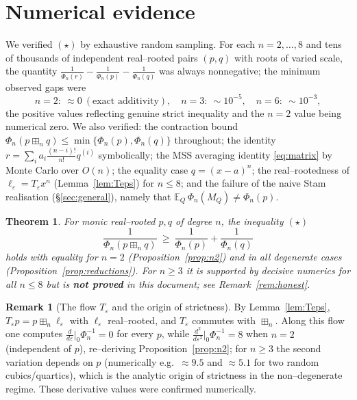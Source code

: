 \documentclass[12pt]{article}
\newtheorem{theorem}{Theorem}
\theoremstyle{definition}
\newtheorem{remark}{Remark}
\newcommand{\bE}{\mathbb{E}}
\newcommand{\boxp}{\boxplus_n}
\begin{document}
\section{Numerical evidence}

We verified $(\star)$ by exhaustive random sampling. For each $n=2,\dots,8$ and tens of
thousands of independent real--rooted pairs $(p,q)$ with roots of varied scale, the
quantity $\frac1{\Phi_n(r)}-\frac1{\Phi_n(p)}-\frac1{\Phi_n(q)}$ was always nonnegative; the
minimum observed gaps were
\[
n{=}2{:}\ \approx0\ (\text{exact additivity}),\quad
n{=}3{:}\ \sim10^{-5},\quad
n{=}6{:}\ \sim10^{-3},
\]
the positive values reflecting genuine strict inequality and the $n=2$ value being numerical
zero. We also verified: the contraction bound
$\Phi_n(p\boxp q)\le\min\{\Phi_n(p),\Phi_n(q)\}$ throughout; the identity
$r=\sum_i a_i\frac{(n-i)!}{n!}q^{(i)}$ symbolically; the MSS averaging identity
\eqref{eq:matrix} by Monte Carlo over $O(n)$; the equality case $q=(x-a)^n$; the
real--rootedness of $\ell_\varepsilon=T_\varepsilon x^n$ (Lemma~\ref{lem:Teps}) for
$n\le8$; and the failure of the naive Stam realisation (\S\ref{sec:general}), namely that
$\bE_Q\,\Phi_n(M_Q)\ne\Phi_n(p)$.

\begin{theorem}\label{thm:main}
For monic real--rooted $p,q$ of degree $n$, the inequality $(\star)$
\[
\frac{1}{\Phi_n(p\boxp q)}\ \ge\ \frac{1}{\Phi_n(p)}+\frac{1}{\Phi_n(q)}
\]
holds with equality for $n=2$ (Proposition~\ref{prop:n2}) and in all degenerate cases
(Proposition~\ref{prop:reductions}). For $n\ge3$ it is supported by decisive numerics for all
$n\le8$ but is \textbf{not proved} in this document; see Remark~\ref{rem:honest}.
\end{theorem}

\begin{remark}[The flow $T_\varepsilon$ and the origin of strictness]
By Lemma~\ref{lem:Teps}, $T_\varepsilon p=p\boxp\ell_\varepsilon$ with $\ell_\varepsilon$
real--rooted, and $T_\varepsilon$ commutes with $\boxp$. Along this flow one computes
$\frac{d}{d\varepsilon}\big|_0\Phi_n^{-1}=0$ for every $p$, while
$\frac{d^2}{d\varepsilon^2}\big|_0\Phi_n^{-1}=8$ when $n=2$ (independent of $p$),
re--deriving Proposition~\ref{prop:n2}; for $n\ge3$ the second variation depends on $p$
(numerically e.g.\ $\approx9.5$ and $\approx5.1$ for two random cubics/quartics), which is the
analytic origin of strictness in the non--degenerate regime. These derivative values were
confirmed numerically.
\end{remark}
\end{document}
